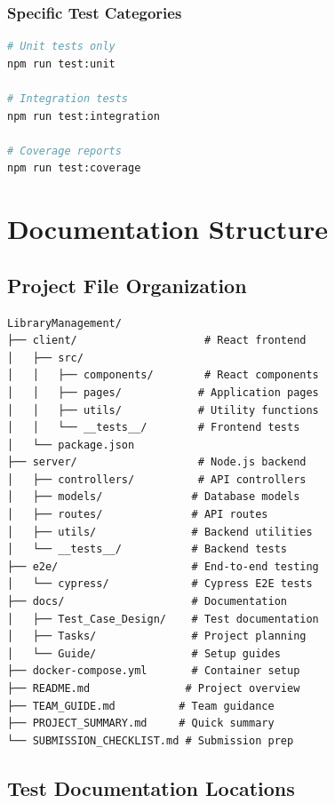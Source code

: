 \documentclass[12pt,a4paper]{article}
\begin{document}
\subsubsection{Specific Test Categories}
\begin{lstlisting}[language=bash]
# Unit tests only
npm run test:unit

# Integration tests
npm run test:integration

# Coverage reports
npm run test:coverage
\end{lstlisting}

\section{Documentation Structure}

\subsection{Project File Organization}

\begin{lstlisting}
LibraryManagement/
├── client/                    # React frontend
│   ├── src/
│   │   ├── components/        # React components
│   │   ├── pages/            # Application pages
│   │   ├── utils/            # Utility functions
│   │   └── __tests__/        # Frontend tests
│   └── package.json
├── server/                   # Node.js backend
│   ├── controllers/          # API controllers
│   ├── models/              # Database models
│   ├── routes/              # API routes
│   ├── utils/               # Backend utilities
│   └── __tests__/           # Backend tests
├── e2e/                     # End-to-end testing
│   └── cypress/             # Cypress E2E tests
├── docs/                    # Documentation
│   ├── Test_Case_Design/    # Test documentation
│   ├── Tasks/               # Project planning
│   └── Guide/               # Setup guides
├── docker-compose.yml       # Container setup
├── README.md               # Project overview
├── TEAM_GUIDE.md          # Team guidance
├── PROJECT_SUMMARY.md     # Quick summary
└── SUBMISSION_CHECKLIST.md # Submission prep
\end{lstlisting}

\subsection{Test Documentation Locations}
\end{document}
